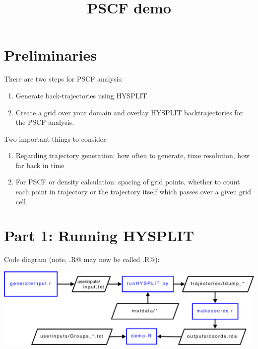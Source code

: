 \documentclass{article}
\title{PSCF demo}
\date{}
\begin{document}
\maketitle

\section{Preliminaries}

There are two steps for PSCF analysis:
\begin{enumerate}
\item Generate back-trajectories using HYSPLIT
\item Create a grid over your domain and overlay HYSPLIT
  backtrajectories for the PSCF analysis.
\end{enumerate}

Two important things to consider: 
\begin{enumerate}
\item Regarding trajectory generation: how often to generate, time
  resolution, how far back in time
\item For PSCF or density calculation: spacing of grid points, whether
  to count each point in trajectory or the trajectory itself which
  passes over a given grid cell.
\end{enumerate}

\section{Part 1: Running HYSPLIT}

Code diagram (note, \verb@demo.R@ may now be called \verb@PSCFdemo.R@):
\begin{center}
\includegraphics[width=.7\textwidth]{figures/IO.pdf}  
\end{center}
\end{document}

